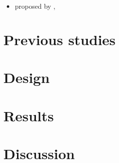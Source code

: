 \documentclass[fleqn,reqno,10pt,draft]{article}
\begin{document}
\begin{itemize}
\item proposed by
  \citet{Horn2006:The-Border-Wars,Geurts2009:Scalar-Implicat,Geurts2010:Quantity-Implic},
  \citep[c.f.][]{ChemlaSpector2010:Experimental-Ev}
\end{itemize}





\newpage

\section{Previous studies}
\label{sec:previous-studies}

\lipsum[1]

\section{Design}
\label{sec:design}

\lipsum[1]

\section{Results}
\label{sec:results}

\lipsum[1]

\section{Discussion}
\label{sec:discussion}

\lipsum[1]





\printbibliography[heading=bibintoc]
\end{document}
